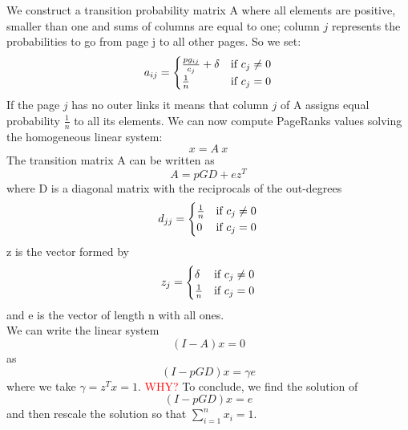\documentclass[12 pt]{article}
\begin{document}
We construct a transition probability matrix A where all elements are positive, smaller than one and sums of columns are equal to one; column $j$ represents the probabilities to go from page j to all other pages. So we set:
\begin{equation}\notag
a_{ij} = 
\begin{cases}
\frac{pg_{ij}}{c_{j}} + \delta  & \text{if } c_{j} \neq 0\\
\frac{1}{n} & \text{if } c_{j} = 0
\end{cases}
\end{equation}
If the page $j$ has no outer links it means that column $j$ of A assigns equal probability $\frac{1}{n}$ to all its elements. We can now compute PageRanks values solving the homogeneous linear system:
$$x = A\:x$$
The transition matrix A can be written as
$$A = pGD+ez^{T}$$
where D is a diagonal matrix with the reciprocals of the out-degrees
\begin{equation}\notag
d_{jj} = 
\begin{cases}
\frac{1}{n} & \text{if } c_{j} \neq 0\\
0 & \text{if } c_{j} = 0
\end{cases}
\end{equation}
z is the vector formed by
\begin{equation}\notag
z_{j} = 
\begin{cases}
\delta & \text{if } c_{j} \neq 0\\
\frac{1}{n} & \text{if } c_{j} = 0
\end{cases}
\end{equation}
and e is the vector of length n with all ones.\\
We can write the linear system
$$(I-A)x=0$$
as
$$(I - pGD)x = \gamma e$$
where we take $\gamma = z^{T} x=1$. \textcolor{red}{WHY?}
To conclude, we find the solution of
$$(I - pGD)x = e$$
and then rescale the solution so that $\sum\limits_{i=1}^{n} x_i = 1$.
\end{document}
